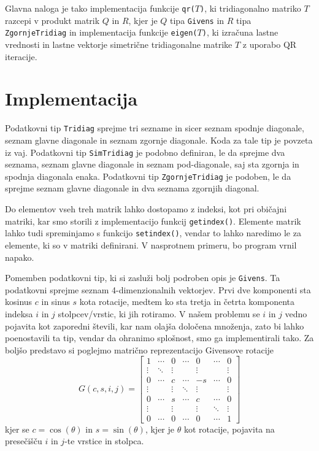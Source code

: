 \documentclass[11pt, titlepage]{article}
\begin{document}
Glavna naloga je tako implementacija funkcije \texttt{qr($T$)}, ki tridiagonalno matriko $T$ razcepi v produkt matrik $Q$ in $R$, kjer je $Q$ tipa \texttt{Givens} in $R$ tipa \texttt{ZgornjeTridiag} in
implementacija funkcije \texttt{eigen($T$)}, ki izračuna lastne vrednosti in lastne vektorje simetrične tridiagonalne matrike $T$ z uporabo QR iteracije.

\section{Implementacija}
Podatkovni tip \texttt{Tridiag} sprejme tri sezname in sicer seznam spodnje diagonale, seznam glavne diagonale in seznam zgornje diagonale.
Koda za tale tip je povzeta iz vaj. Podatkovni tip \texttt{SimTridiag} je podobno definiran, le da sprejme dva seznama, seznam glavne diagonale in seznam pod-diagonale, 
saj sta zgornja in spodnja diagonala enaka. Podatkovni tip \texttt{ZgornjeTridiag} je podoben, le da sprejme seznam glavne diagonale in dva seznama zgornjih diagonal.

Do elementov vseh treh matrik lahko dostopamo z indeksi, kot pri običajni matriki, kar smo storili z implementacijo funkcij \texttt{getindex()}. Elemente matrik lahko tudi spreminjamo s funkcijo \texttt{setindex()},
vendar to lahko naredimo le za elemente, ki so v matriki definirani. V nasprotnem primeru, bo program vrnil napako.

Pomemben podatkovni tip, ki si zasluži bolj podroben opis je \texttt{Givens}. Ta podatkovni sprejme seznam 4-dimenzionalnih vektorjev. Prvi dve komponenti sta kosinus $c$ in sinus $s$ kota rotacije, medtem ko sta tretja in četrta komponenta
indeksa $i$ in $j$ stolpcev/vrstic, ki jih rotiramo. V našem problemu se $i$ in $j$ vedno pojavita kot zaporedni števili, kar nam olajša določena množenja, zato bi lahko poenostavili ta tip, vendar da ohranimo splošnost, smo ga implementirali tako. 
Za boljšo predstavo si poglejmo matrično reprezentacijo Givensove rotacije
\[
G(c,s,i,j) =
\begin{bmatrix}
1      & \cdots & 0      & \cdots & 0      & \cdots & 0      \\
\vdots & \ddots & \vdots &        & \vdots &        & \vdots \\
0      & \cdots & c      & \cdots & -s     & \cdots & 0      \\
\vdots &        & \vdots & \ddots & \vdots &        & \vdots \\
0      & \cdots & s      & \cdots & c      & \cdots & 0      \\
\vdots &        & \vdots &        & \vdots & \ddots & \vdots \\
0      & \cdots & 0      & \cdots & 0      & \cdots & 1      
\end{bmatrix}
\]
kjer se $c = \cos(\theta)$ in $s = \sin(\theta)$, kjer je $\theta$ kot rotacije, pojavita na presečišču $i$ in $j$-te vrstice in stolpca.
\end{document}
